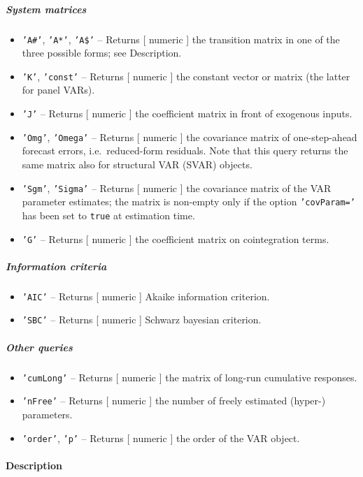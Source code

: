 \subparagraph{System matrices}

\begin{itemize}
\item
  \texttt{'A\#'}, \texttt{'A*'}, \texttt{'A\$'} -- Returns {[} numeric
  {]} the transition matrix in one of the three possible forms; see
  Description.
\item
  \texttt{'K'}, \texttt{'const'} -- Returns {[} numeric {]} the constant
  vector or matrix (the latter for panel VARs).
\item
  \texttt{'J'} -- Returns {[} numeric {]} the coefficient matrix in
  front of exogenous inputs.
\item
  \texttt{'Omg'}, \texttt{'Omega'} -- Returns {[} numeric {]} the
  covariance matrix of one-step-ahead forecast errors, i.e.~reduced-form
  residuals. Note that this query returns the same matrix also for
  structural VAR (SVAR) objects.
\item
  \texttt{'Sgm'}, \texttt{'Sigma'} -- Returns {[} numeric {]} the
  covariance matrix of the VAR parameter estimates; the matrix is
  non-empty only if the option \texttt{'covParam='} has been set to
  \texttt{true} at estimation time.
\item
  \texttt{'G'} -- Returns {[} numeric {]} the coefficient matrix on
  cointegration terms.
\end{itemize}

\subparagraph{Information criteria}

\begin{itemize}
\item
  \texttt{'AIC'} -- Returns {[} numeric {]} Akaike information
  criterion.
\item
  \texttt{'SBC'} -- Returns {[} numeric {]} Schwarz bayesian criterion.
\end{itemize}

\subparagraph{Other queries}

\begin{itemize}
\item
  \texttt{'cumLong'} -- Returns {[} numeric {]} the matrix of long-run
  cumulative responses.
\item
  \texttt{'nFree'} -- Returns {[} numeric {]} the number of freely
  estimated (hyper-) parameters.
\item
  \texttt{'order'}, \texttt{'p'} -- Returns {[} numeric {]} the order of
  the VAR object.
\end{itemize}

\paragraph{Description}


